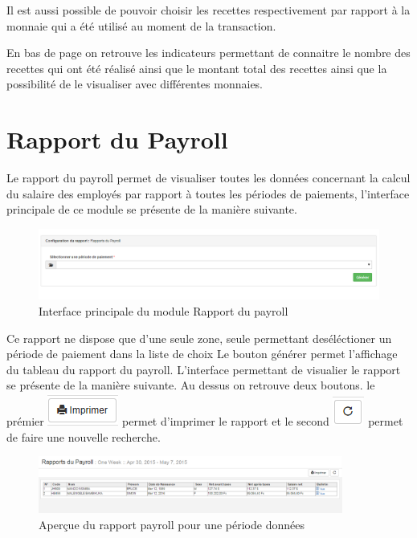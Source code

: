 \documentclass[12pt,a4paper]{report}
\begin{document}
Il est aussi possible de pouvoir choisir les recettes respectivement par rapport à la monnaie qui a été utilisé au moment de la transaction.

En bas de page on retrouve les indicateurs permettant de connaitre le nombre des recettes qui ont été réalisé ainsi que le montant total des recettes ainsi que la possibilité de le visualiser avec différentes monnaies. 


\newpage
\section{Rapport du Payroll}
Le rapport du payroll permet de visualiser toutes les données concernant la calcul du salaire des employés par rapport à toutes les périodes de paiements, l'interface principale de ce module se présente de la manière suivante.

\begin{figure}[h]
\begin{center}
\includegraphics[width=14cm]{pic/RapportPayrollDataBase.png}
\end{center}
\caption{Interface principale du module Rapport du payroll}
\label{Interface principale du module Rapport du payroll}
\end{figure}

Ce rapport ne dispose que d'une seule zone, seule permettant deséléctioner un période de paiement dans la liste de choix
Le bouton générer permet l'affichage du tableau du rapport du payroll. L'interface permettant de visualier le rapport se présente de la manière suivante. Au dessus on retrouve deux boutons. le prémier 
\includegraphics[scale=0.7]{pic/Print.png} permet d'imprimer le rapport et le second \includegraphics[scale=0.7]{pic/refresh.png} permet de faire une nouvelle recherche.

\begin{figure}[h]
\begin{center}
\includegraphics[width=10cm]{pic/ResultatPayroll.png}
\end{center}
\caption{Aperçue du rapport payroll pour une période données}
\label{Aperçue du rapport payroll pour une période données}
\end{figure}
\end{document}
